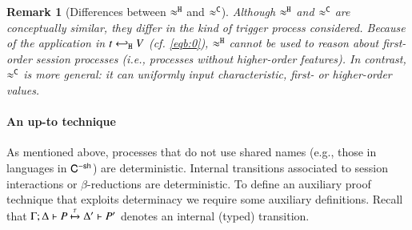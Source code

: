 \documentclass[preprint,11pt]{elsarticle}
\newtheorem{definition}{Definition}[section]
\newtheorem{remark}{Remark}[section]
\begin{document}
{{\begin{remark}[Differences between $\approx^\mathtt{H}$ and $\approx^\mathtt{C}$]
Although $\approx^\mathtt{H}$ and $\approx^\mathtt{C}$ are conceptually similar, they differ in the kind of 
trigger process considered. Because of the application in 
$t \hookleftarrow_{\mathtt{H}} V$ (cf. \eqref{eqb:0}), $\approx^\mathtt{H}$ cannot be used to reason about first-order session processes (i.e., processes without higher-order features). In contrast, $\approx^\mathtt{C}$ is more general: it can uniformly input characteristic, first- or higher-order values. 
\end{remark}

%
%
%


\paragraph{An up-to technique}
As mentioned above, processes that do not use shared names (e.g., those in languages in $\mathsf{C}^{-\mathsf{sh}}$) are deterministic. 
Internal transitions associated to session interactions or  
$\beta$-reductions are deterministic.  
To define an auxiliary proof technique that exploits determinacy we require some auxiliary definitions.
Recall that $\Gamma; \Delta \vdash P \xmapsto{\tau} \Delta' \vdash P'$ denotes an internal (typed) transition.
		
}}
\end{document}
